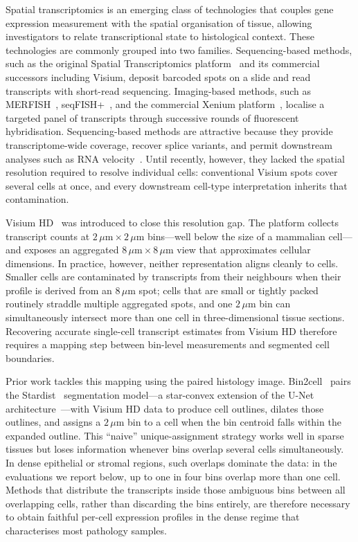 \documentclass[11pt]{article}
\begin{document}
Spatial transcriptomics is an emerging class of technologies that couples gene expression measurement with the spatial organisation of tissue, allowing investigators to relate transcriptional state to histological context. These technologies are commonly grouped into two families. Sequencing-based methods, such as the original Spatial Transcriptomics platform~\cite{stahl2016spatialtranscriptomics} and its commercial successors including Visium, deposit barcoded spots on a slide and read transcripts with short-read sequencing. Imaging-based methods, such as MERFISH~\cite{chen2015merfish,moffitt2018merfish}, seqFISH+~\cite{eng2019transcriptome}, and the commercial Xenium platform~\cite{janesick2023xenium,rao2021xenium}, localise a targeted panel of transcripts through successive rounds of fluorescent hybridisation. Sequencing-based methods are attractive because they provide transcriptome-wide coverage, recover splice variants, and permit downstream analyses such as RNA velocity~\cite{lamanno2018rnavelocity}. Until recently, however, they lacked the spatial resolution required to resolve individual cells: conventional Visium spots cover several cells at once, and every downstream cell-type interpretation inherits that contamination.

Visium HD~\cite{10xvisiumhd2024} was introduced to close this resolution gap. The platform collects transcript counts at $2\,\mu\mathrm{m}\times 2\,\mu\mathrm{m}$ bins---well below the size of a mammalian cell---and exposes an aggregated $8\,\mu\mathrm{m}\times 8\,\mu\mathrm{m}$ view that approximates cellular dimensions. In practice, however, neither representation aligns cleanly to cells. Smaller cells are contaminated by transcripts from their neighbours when their profile is derived from an $8\,\mu\mathrm{m}$ spot; cells that are small or tightly packed routinely straddle multiple aggregated spots, and one $2\,\mu\mathrm{m}$ bin can simultaneously intersect more than one cell in three-dimensional tissue sections. Recovering accurate single-cell transcript estimates from Visium HD therefore requires a mapping step between bin-level measurements and segmented cell boundaries.

Prior work tackles this mapping using the paired histology image. Bin2cell~\cite{polacco2024bin2cell} pairs the Stardist~\cite{schmidt2018stardist} segmentation model---a star-convex extension of the U-Net architecture~\cite{ronneberger2015unet}---with Visium HD data to produce cell outlines, dilates those outlines, and assigns a $2\,\mu\mathrm{m}$ bin to a cell when the bin centroid falls within the expanded outline. This ``naive'' unique-assignment strategy works well in sparse tissues but loses information whenever bins overlap several cells simultaneously. In dense epithelial or stromal regions, such overlaps dominate the data: in the evaluations we report below, up to one in four bins overlap more than one cell. Methods that distribute the transcripts inside those ambiguous bins between all overlapping cells, rather than discarding the bins entirely, are therefore necessary to obtain faithful per-cell expression profiles in the dense regime that characterises most pathology samples.
\end{document}
